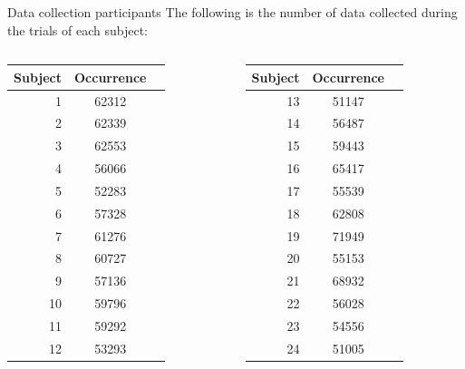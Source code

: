 \documentclass{beamer}
\begin{document}
\begin{frame}{Data collection participants}
The following is the number of data collected during the trials of each subject:
\begin{columns}[t, onlytextwidth]
	\begin{table} 
		\centering
		\begin{tabular}{rcc}
			Subject & Occurrence\\\hline
			1     & 62312\\
			2     & 62339\\
			3     & 62553\\
			4     & 56066\\
			5     & 52283\\
			6     & 57328\\
			7     & 61276\\
			8     & 60727\\
			9     & 57136\\
			10   &  59796\\
			11   &  59292\\
			12   &  53293\\
		\end{tabular}
	\end{table}
	
	\begin{table} 
		\centering
		\begin{tabular}{rcc}
			Subject & Occurrence \\\hline
			13    &  51147\\
			14    &  56487\\
			15    &  59443\\
			16    &  65417\\
			17    &  55539\\
			18    &  62808\\
			19    &  71949\\
			20    &  55153\\
			21    &  68932\\
			22    &  56028\\
			23    &  54556\\
			24    &  51005\\
		\end{tabular}
	\end{table}
\end{columns}
\end{frame}
\end{document}
